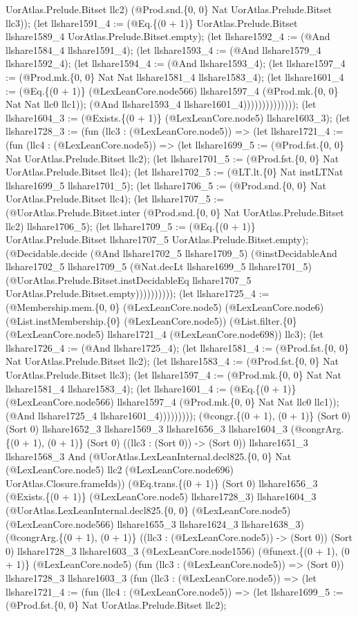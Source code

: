 \documentclass[11pt]{article}
\begin{document}
UorAtlas.Prelude.Bitset llc2) (@Prod.snd.\{0, 0\} Nat UorAtlas.Prelude.Bitset llc3)); (let llshare1591\_4 := (@Eq.\{(0 + 1)\} UorAtlas.Prelude.Bitset llshare1589\_4 UorAtlas.Prelude.Bitset.empty); (let llshare1592\_4 := (@And llshare1584\_4 llshare1591\_4); (let llshare1593\_4 := (@And llshare1579\_4 llshare1592\_4); (let llshare1594\_4 := (@And llshare1593\_4); (let llshare1597\_4 := (@Prod.mk.\{0, 0\} Nat Nat llshare1581\_4 llshare1583\_4); (let llshare1601\_4 := (@Eq.\{(0 + 1)\} (@LexLeanCore.node566) llshare1597\_4 (@Prod.mk.\{0, 0\} Nat Nat llc0 llc1)); (@And llshare1593\_4 llshare1601\_4)))))))))))))); (let llshare1604\_3 := (@Exists.\{(0 + 1)\} (@LexLeanCore.node5) llshare1603\_3); (let llshare1728\_3 := (fun (llc3 : (@LexLeanCore.node5)) => (let llshare1721\_4 := (fun (llc4 : (@LexLeanCore.node5)) => (let llshare1699\_5 := (@Prod.fst.\{0, 0\} Nat UorAtlas.Prelude.Bitset llc2); (let llshare1701\_5 := (@Prod.fst.\{0, 0\} Nat UorAtlas.Prelude.Bitset llc4); (let llshare1702\_5 := (@LT.lt.\{0\} Nat instLTNat llshare1699\_5 llshare1701\_5); (let llshare1706\_5 := (@Prod.snd.\{0, 0\} Nat UorAtlas.Prelude.Bitset llc4); (let llshare1707\_5 := (@UorAtlas.Prelude.Bitset.inter (@Prod.snd.\{0, 0\} Nat UorAtlas.Prelude.Bitset llc2) llshare1706\_5); (let llshare1709\_5 := (@Eq.\{(0 + 1)\} UorAtlas.Prelude.Bitset llshare1707\_5 UorAtlas.Prelude.Bitset.empty); (@Decidable.decide (@And llshare1702\_5 llshare1709\_5) (@instDecidableAnd llshare1702\_5 llshare1709\_5 (@Nat.decLt llshare1699\_5 llshare1701\_5) (@UorAtlas.Prelude.Bitset.instDecidableEq llshare1707\_5 UorAtlas.Prelude.Bitset.empty)))))))))); (let llshare1725\_4 := (@Membership.mem.\{0, 0\} (@LexLeanCore.node5) (@LexLeanCore.node6) (@List.instMembership.\{0\} (@LexLeanCore.node5)) (@List.filter.\{0\} (@LexLeanCore.node5) llshare1721\_4 (@LexLeanCore.node698)) llc3); (let llshare1726\_4 := (@And llshare1725\_4); (let llshare1581\_4 := (@Prod.fst.\{0, 0\} Nat UorAtlas.Prelude.Bitset llc2); (let llshare1583\_4 := (@Prod.fst.\{0, 0\} Nat UorAtlas.Prelude.Bitset llc3); (let llshare1597\_4 := (@Prod.mk.\{0, 0\} Nat Nat llshare1581\_4 llshare1583\_4); (let llshare1601\_4 := (@Eq.\{(0 + 1)\} (@LexLeanCore.node566) llshare1597\_4 (@Prod.mk.\{0, 0\} Nat Nat llc0 llc1)); (@And llshare1725\_4 llshare1601\_4))))))))); (@congr.\{(0 + 1), (0 + 1)\} (Sort 0) (Sort 0) llshare1652\_3 llshare1569\_3 llshare1656\_3 llshare1604\_3 (@congrArg.\{(0 + 1), (0 + 1)\} (Sort 0) ((llc3 : (Sort 0)) -> (Sort 0)) llshare1651\_3 llshare1568\_3 And (@UorAtlas.LexLeanInternal.decl825.\{0, 0\} Nat (@LexLeanCore.node5) llc2 (@LexLeanCore.node696) UorAtlas.Closure.frameIds)) (@Eq.trans.\{(0 + 1)\} (Sort 0) llshare1656\_3 (@Exists.\{(0 + 1)\} (@LexLeanCore.node5) llshare1728\_3) llshare1604\_3 (@UorAtlas.LexLeanInternal.decl825.\{0, 0\} (@LexLeanCore.node5) (@LexLeanCore.node566) llshare1655\_3 llshare1624\_3 llshare1638\_3) (@congrArg.\{(0 + 1), (0 + 1)\} ((llc3 : (@LexLeanCore.node5)) -> (Sort 0)) (Sort 0) llshare1728\_3 llshare1603\_3 (@LexLeanCore.node1556) (@funext.\{(0 + 1), (0 + 1)\} (@LexLeanCore.node5) (fun (llc3 : (@LexLeanCore.node5)) => (Sort 0)) llshare1728\_3 llshare1603\_3 (fun (llc3 : (@LexLeanCore.node5)) => (let llshare1721\_4 := (fun (llc4 : (@LexLeanCore.node5)) => (let llshare1699\_5 := (@Prod.fst.\{0, 0\} Nat UorAtlas.Prelude.Bitset llc2); 
\end{document}
